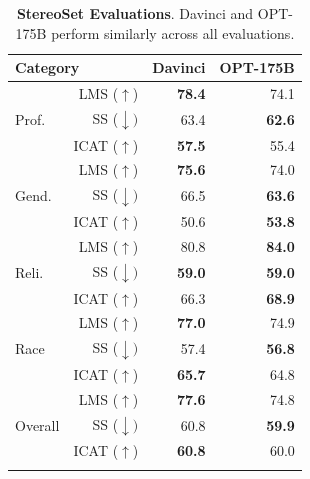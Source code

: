 \documentclass[11pt]{article}
\newcommand{\tablewhitespace}{\addlinespace[0.3em]}
\newcommand{\OPT}[0]{{OPT-175B}}
\newcommand{\davinci}[0]{{Davinci}}
\begin{document}
\begin{table}[t]
    \centering
    \begin{tabular}{lrrr}
        \toprule
        \multicolumn{2}{l}{{\bf Category}} & {\bf Davinci} & {\bf \OPT{}} \\
        \midrule
        \multirow{3}{*}{Prof.}   & LMS ($\uparrow$)   & {\bf 78.4} & 74.1\\
                                 & SS  ($\downarrow)$ & {    63.4} & {\bf 62.6}\\
                                 & ICAT ($\uparrow$)  & {\bf 57.5} & 55.4\\

        \cmidrule(lr){1-4}             
        \multirow{3}{*}{Gend.}   & LMS ($\uparrow$)   & {\bf 75.6} & 74.0\\
                                 & SS  ($\downarrow)$ & {    66.5} & {\bf 63.6}\\
                                 & ICAT ($\uparrow$)  & {    50.6} & {\bf 53.8}\\

        \cmidrule(lr){1-4}             
        \multirow{3}{*}{Reli.}   & LMS ($\uparrow$)   & {    80.8} & {\bf 84.0}\\
                                 & SS  ($\downarrow)$ & {\bf 59.0} & {\bf 59.0}\\
                                 & ICAT ($\uparrow$)  & {    66.3} & {\bf 68.9}\\

        \cmidrule(lr){1-4}             
        \multirow{3}{*}{Race}    & LMS ($\uparrow$)   & {\bf 77.0} & 74.9\\
                                 & SS  ($\downarrow)$ & {    57.4} & {\bf 56.8}\\
                                 & ICAT ($\uparrow$)  & {\bf 65.7} & 64.8\\

        \cmidrule(lr){1-4}             
        \multirow{3}{*}{Overall} & LMS ($\uparrow$)   & {\bf 77.6} & 74.8\\
                                 & SS  ($\downarrow)$ & {    60.8} & {\bf 59.9}\\
                                 & ICAT ($\uparrow$)  & {\bf 60.8} & 60.0\\

        \tablewhitespace
        \bottomrule
    \end{tabular}
    \caption{{\bf StereoSet Evaluations}. \davinci{} and \OPT{} perform similarly across all evaluations.}
    \label{tab:stereoset}
\end{table}
\end{document}
